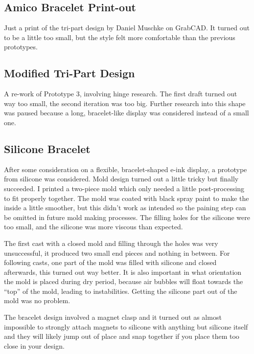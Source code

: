 \subsection{Amico Bracelet Print-out}

Just a print of the tri-part design by Daniel Muschke on GrabCAD. It turned out to be a little too small, but the style felt more comfortable than the previous prototypes.

\subsection{Modified Tri-Part Design}

A re-work of Prototype 3, involving hinge research. The first draft turned out way too small, the second iteration was too big. Further research into this shape was paused because a long, bracelet-like display was considered instead of a small one.

\subsection{Silicone Bracelet}

After some consideration on a flexible, bracelet-shaped e-ink display, a prototype from silicone was considered. Mold design turned out a little tricky but finally succeeded. I printed a two-piece mold which only needed a little post-processing to fit properly together. The mold was coated with black spray paint to make the inside a little smoother, but this didn't work as intended so the paining step can be omitted in future mold making processes. The filling holes for the silicone were too small, and the silicone was more viscous than expected.

The first cast with a closed mold and filling through the holes was very unsuccessful, it produced two small end pieces and nothing in between. For following casts, one part of the mold was filled with silicone and closed afterwards, this turned out way better. It is also important in what orientation the mold is placed during dry period, because air bubbles will float towards the ``top'' of the mold, leading to instabilities. Getting the silicone part out of the mold was no problem.

The bracelet design involved a magnet clasp and it turned out as almost impossible to strongly attach magnets to silicone with anything but silicone itself and they will likely jump out of place and snap together if you place them too close in your design.

